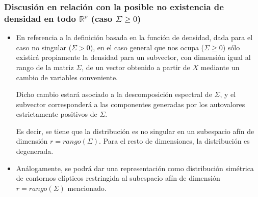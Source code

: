 \documentclass[11pt,a4paper]{article}
\begin{document}
\subsubsection{Discusión en relación con la posible no existencia de densidad en todo \texorpdfstring{$\mathbb{R}^{p}$}) (caso \texorpdfstring{$\Sigma \geq 0$}))}
\begin{itemize}
\item En referencia a la definición basada en la función de densidad, dada para el caso no singular ($\Sigma > 0$), en el caso general que nos ocupa ($\Sigma \geq 0$) sólo existirá propiamente la densidad para un subvector, con dimensión igual al rango de la matriz $\Sigma$, de un vector obtenido a partir de $X$ mediante un cambio de variables conveniente.

Dicho cambio estará asociado a la descomposición espectral de $\Sigma$, y el subvector corresponderá a las componentes generadas por los autovalores estrictamente positivos de $\Sigma$.

Es decir, se tiene que la distribución es no singular en un subespacio afín de dimensión $r = rango(\Sigma)$. Para el resto de dimensiones, la distribución es degenerada.

\item Análogamente, se podrá dar una representación como distribución simétrica de contornos elípticos restringida al subespacio afín de dimensión $r = rango(\Sigma)$ mencionado.
\end{itemize}
\end{document}
